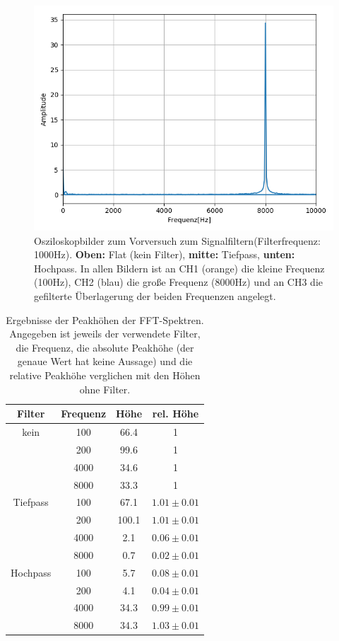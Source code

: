\documentclass[12pt,a4paper]{article}
\begin{document}
\begin{figure}
\includegraphics[scale=0.5]{Bilder/Vorversuch3/Vor3_5.png}
\caption{Osziloskopbilder zum Vorversuch zum Signalfiltern(Filterfrequenz: 1000Hz). \textbf{Oben:} Flat (kein Filter), \textbf{mitte:} Tiefpass, \textbf{unten:} Hochpass.
In allen Bildern ist an CH1 (orange) die kleine Frequenz (100Hz), CH2 (blau) die große Frequenz (8000Hz) und an CH3 die gefilterte Überlagerung der beiden Frequenzen angelegt.}
\label{fig:Vor3_Oszi2}
\end{figure}

\begin{table}
\centering
\begin{tabular}{|c|c|c|c|}
\hline
Filter & Frequenz & Höhe & rel. Höhe\\
\hline
kein & 100 & 66.4 & 1\\
\cline{2-4}
& 200 & 99.6 & 1\\
\cline{2-4}
& 4000 & 34.6 & 1\\
\cline{2-4}
& 8000 & 33.3 & 1\\
\hline
\hline
Tiefpass & 100 & 67.1 & $1.01\pm 0.01$\\
\cline{2-4}
& 200 & 100.1 & $1.01\pm 0.01$\\
\cline{2-4}
& 4000 & 2.1 & $0.06\pm 0.01$\\
\cline{2-4}
& 8000 & 0.7 & $0.02\pm 0.01$\\
\hline
\hline
Hochpass & 100 & 5.7 & $0.08\pm 0.01$\\
\cline{2-4}
& 200 & 4.1 & $0.04\pm 0.01$\\
\cline{2-4}
& 4000 & 34.3 & $0.99\pm 0.01$\\
\cline{2-4}
& 8000 & 34.3 & $1.03\pm 0.01$\\
\hline
\end{tabular} 
\caption{Ergebnisse der Peakhöhen der FFT-Spektren. Angegeben ist jeweils der verwendete Filter, die Frequenz, die absolute Peakhöhe (der genaue Wert hat keine Aussage) und die relative Peakhöhe verglichen mit den Höhen ohne Filter.}
\label{tab:Peakhohen}
\end{table}
\end{document}
